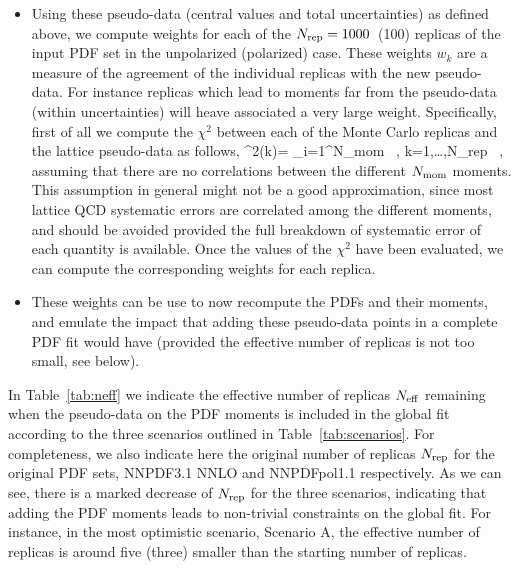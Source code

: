 \begin{itemize}
\item Using these pseudo-data (central values and total uncertainties)
  as defined above, we compute
  weights for each of the $N_{\rm rep}=1000$~(100) replicas of the input PDF set
  in the unpolarized (polarized) case.
  These weights $w_k$ are a measure of the agreement of the individual replicas with the new pseudo-data.
  For instance replicas which lead to moments far from the pseudo-data (within uncertainties) will
  heave associated a very large weight.
  Specifically, first of all we compute the $\chi^2$ between each of the Monte Carlo
  replicas and the lattice pseudo-data as follows,
  \be
  \chi^{2(k)}= \sum_{i=1}^{\rm N_{\rm mom}}  \, , \quad k=1,\ldots,N_{\rm rep} \, ,
  \ee
  assuming that there are no correlations between the different $N_{\rm mom}$ moments.
  This assumption in general might not be a good approximation, since most lattice
  QCD systematic errors are correlated among the different moments, and should be
  avoided provided the full breakdown of systematic error of each quantity is available.
  Once the values of the $\chi^2$ have been evaluated,
  we can compute the corresponding weights for each replica.
\item These weights can be use to now recompute the PDFs and their moments, and emulate the
  impact that adding these pseudo-data points in a complete PDF fit would have (provided
  the effective number of replicas is not too small, see below).
  \end{itemize}

In Table~\ref{tab:neff} we indicate the effective number of replicas
    $N_{\rm eff}$ remaining when the pseudo-data
    on the PDF moments is included in the global
    fit according to the three scenarios outlined
    in Table~\ref{tab:scenarios}.
    For completeness, we also indicate here the original number
    of replicas $N_{\rm rep}$ for the original
    PDF sets, NNPDF3.1 NNLO and NNPDFpol1.1 respectively.
    As we can see, there is a marked decrease of $N_{\rm rep}$
    for the three scenarios, indicating that adding the
    PDF moments leads to non-trivial constraints on the global
    fit.
    For instance, in the most optimistic scenario,
    Scenario A, the effective number of replicas is around five (three)
 smaller than the starting number of replicas.

